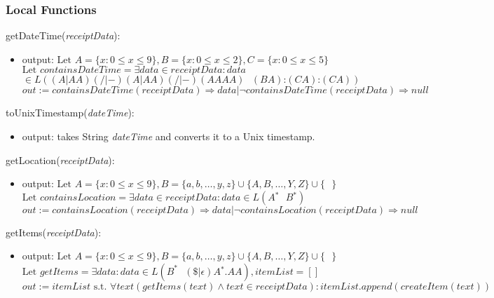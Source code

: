 \documentclass[12pt, titlepage]{article}
\begin{document}
\subsubsection{Local Functions}

\noindent getDateTime(\textit{receiptData}):
\begin{itemize}
  \item output: $\text{Let } A=\{x : 0 \leq x \leq 9\}, B=\{x : 0 \leq x \leq 2\}, C=\{x : 0 \leq x \leq 5\}$ \\
                $\text{Let } containsDateTime=\exists data \in receiptData : data$\\ $\in L((A|AA)(/|-)(A|AA)(/|-)(AAAA)\text{ }(BA)\text{:}(CA)\text{:}(CA))$ \\
                $out := containsDateTime(receiptData) \Rightarrow data | \neg containsDateTime(receiptData) \Rightarrow null$
\end{itemize}

\noindent toUnixTimestamp(\textit{dateTime}):
\begin{itemize}
  \item output: takes String \textit{dateTime} and converts it to a Unix timestamp.
\end{itemize}

\noindent getLocation(\textit{receiptData}):
\begin{itemize}
  \item output: $\text{Let } A=\{x : 0 \leq x \leq 9\}, B=\{a,b,\dots,y,z\}\cup\{A,B,\dots,Y,Z\}\cup\{\text{ }\}$ \\
                $\text{Let } containsLocation=\exists data \in receiptData : data \in L(A{}^\ast \text{ } B{}^\ast)$ \\
                $out := containsLocation(receiptData) \Rightarrow data | \neg containsLocation(receiptData) \Rightarrow null$
\end{itemize}

\noindent getItems(\textit{receiptData}):
\begin{itemize}
  \item output: $\text{Let } A=\{x : 0 \leq x \leq 9\}, B=\{a,b,\dots,y,z\}\cup\{A,B,\dots,Y,Z\}\cup\{\text{ }\}$ \\
                $\text{Let } getItems=\exists data : data \in L(B^\ast \text{ } (\$|\epsilon)A{}^\ast.AA), itemList=[]$ \\
                $out := itemList \text{ s.t. } \forall text(getItems(text) \land text \in receiptData) : itemList.append(createItem(text))$
\end{itemize}
\end{document}
